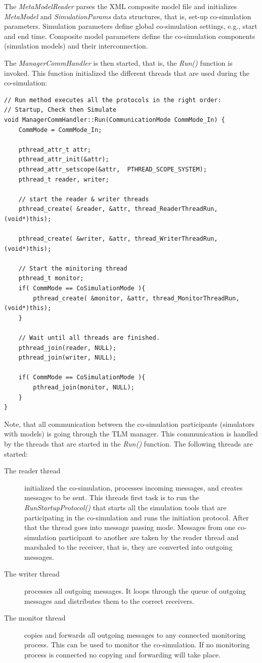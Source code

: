 The {\em MetaModelReader} parses the XML composite model file and initializes {\em MetaModel} and {\em SimulationParams} data structures, that is, set-up co-simulation parameters. 
Simulation parameters define global co-simulation settings, e.g., start and end time. 
Composite model parameters define the co-simulation components (simulation models) and their interconnection.

The {\em ManagerCommHandler} is then started, that is, the {\em Run()} function is invoked. 
This function initialized the different threads that are used during the co-simulation:
{\scriptsize
\begin{verbatim}
// Run method executes all the protocols in the right order:
// Startup, Check then Simulate
void ManagerCommHandler::Run(CommunicationMode CommMode_In) {
    CommMode = CommMode_In;

    pthread_attr_t attr;
    pthread_attr_init(&attr);
    pthread_attr_setscope(&attr,  PTHREAD_SCOPE_SYSTEM);
    pthread_t reader, writer;

    // start the reader & writer threads
    pthread_create( &reader, &attr, thread_ReaderThreadRun, (void*)this);

    pthread_create( &writer, &attr, thread_WriterThreadRun, (void*)this);

    // Start the minitoring thread
    pthread_t monitor;
    if( CommMode == CoSimulationMode ){
        pthread_create( &monitor, &attr, thread_MonitorThreadRun, (void*)this);
    }

    // Wait until all threads are finished.
    pthread_join(reader, NULL);
    pthread_join(writer, NULL);

    if( CommMode == CoSimulationMode ){
        pthread_join(monitor, NULL);
    }
}
\end{verbatim}
}

Note, that all communication between the co-simulation participants (simulators with models) is going through the TLM manager. 
This communication is handled by the threads that are started in the {\em Run()} function. 
The following threads are started:
\begin{description}
\item[The reader thread] initialized the co-simulation, processes incoming messages, and creates messages to be sent. 
This threads first task is to run the {\em RunStartupProtocol()} that starts all the simulation tools that are participating in the co-simulation and runs the initiation protocol. 
After that the thread goes into message passing mode. 
Messages from one co-simulation participant to another are taken by the reader thread and marshaled to the receiver, that is, they are converted into outgoing messages.
\item[The writer thread] processes all outgoing messages. 
It loops through the queue of outgoing messages and distributes them to the correct receivers.
\item[The monitor thread] copies and forwards all outgoing messages to any connected monitoring process. 
This can be used to monitor the co-simulation. 
If no monitoring process is connected no copying and forwarding will take place.
\end{description}

